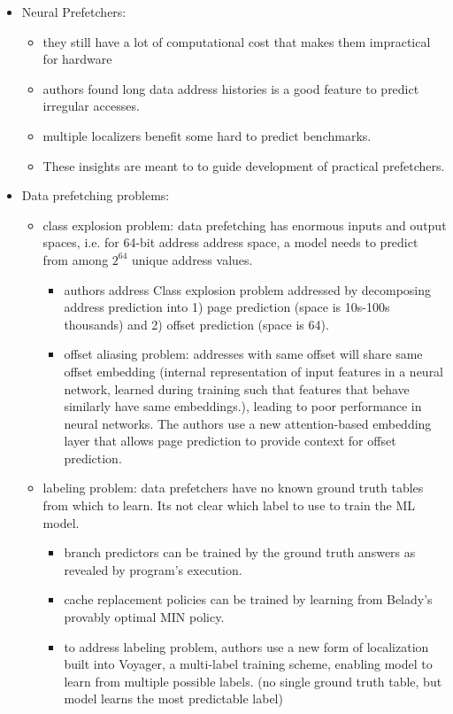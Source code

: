 \documentclass [12pt]{article}
\begin{document}
\begin{itemize}
            \item Neural Prefetchers:
                \begin{itemize}
                    \item they still have a lot of computational cost that makes them impractical for hardware 
                    \item authors found long data address histories is a good feature to predict irregular accesses. 
                    \item multiple localizers benefit some hard to predict benchmarks.
                    \item These insights are meant to to guide development of practical prefetchers. 
                \end{itemize}
            \item Data prefetching problems:
                \begin{itemize}
                    \item class explosion problem: data prefetching has enormous inputs and output spaces, i.e. for 64-bit address address space, a model needs to predict from among $2^{64}$ unique address values. 
                        \begin{itemize}
                            \item authors address Class explosion problem addressed by decomposing address prediction into 1) page prediction (space is 10s-100s thousands) and 2) offset prediction (space is 64). 
                            \item offset aliasing problem: addresses with same offset will share same offset embedding (internal representation of input features in a neural network, learned during training such that features that behave similarly have same embeddings.), leading to poor performance in neural networks. The authors use a new attention-based embedding layer that allows page prediction to provide context for offset prediction. 
                        \end{itemize}
                    \item labeling problem: data prefetchers have no known ground truth tables from which to learn. Its not clear which label to use to train the ML model.
                        \begin{itemize}
                            \item branch predictors can be trained by the ground truth answers as revealed by program's execution. 
                            \item cache replacement policies can be trained by learning from Belady's provably optimal MIN policy.  
                            \item to address labeling problem, authors use a new form of localization built into Voyager, a multi-label training scheme, enabling model to learn from multiple possible labels. (no single ground truth table, but model learns the most predictable label) 
                        \end{itemize}
                \end{itemize}


\end{itemize}
\end{document}
